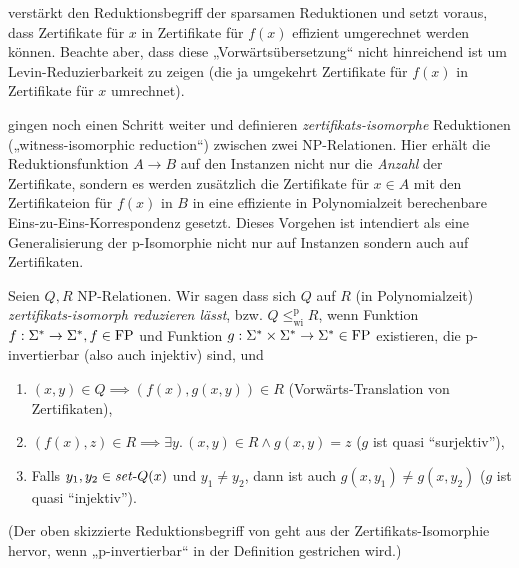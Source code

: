 \textcite{lynch_structure_1978} verstärkt den Reduktionsbegriff der sparsamen Reduktionen und setzt voraus, dass Zertifikate für $x$ in Zertifikate für $f(x)$ effizient umgerechnet werden können. Beachte aber, dass diese „Vorwärtsübersetzung“ nicht hinreichend ist um Levin-Reduzierbarkeit zu zeigen (die ja umgekehrt Zertifikate für $f(x)$ in Zertifikate für $x$ umrechnet).

\cite{wiedermann_witness-isomorphic_1995} gingen noch einen Schritt weiter und definieren \emph{zertifikats-isomorphe} Reduktionen („witness-isomorphic reduction“) zwischen zwei NP-Relationen. Hier erhält die Reduktionsfunktion $A\to B$ auf den Instanzen nicht nur die \emph{Anzahl} der Zertifikate, sondern es werden zusätzlich die Zertifikate für $x\in A$ mit den Zertifikateion für $f(x)$ in $B$ in eine effiziente in Polynomialzeit berechenbare Eins-zu-Eins-Korrespondenz gesetzt. Dieses Vorgehen ist intendiert als eine Generalisierung der p-Isomorphie \parencite{hartmanis_isomorphisms_1976} nicht nur auf Instanzen sondern auch auf Zertifikaten.

\begin{definition}\label{def:wi-reduction}
    Seien $Q, R$ NP-Relationen. Wir sagen dass sich $Q$ auf $R$ (in Polynomialzeit) \emph{zertifikats-isomorph reduzieren lässt}, bzw. $Q\leq_\mathrm{wi}^\mathrm p R$, wenn Funktion $f:\Sigma^*\to\Sigma^*, f\in \mathrm{FP}$ und Funktion $g:\Sigma^*\times\Sigma^*\to\Sigma^*\in\mathrm{FP}$ existieren, die p-invertierbar (also auch injektiv) sind, und 
    \begin{enumerate}
        \item $(x,y)\in Q \implies (f(x), g(x,y))\in R$ (Vorwärts-Translation von Zertifikaten),
        \item $(f(x),z)\in R \implies \exists y.\, (x,y)\in R\land g(x,y)=z$ ($g$ ist quasi “surjektiv”),
        \item Falls $y_1,y_2\in \mathit{set}\text{-}{}Q(x)$ und $y_1\neq y_2$, dann ist auch $g(x,y_1)\neq g(x,y_2)$ ($g$ ist quasi “injektiv”). \qedhere
    \end{enumerate}
\end{definition}
(Der oben skizzierte Reduktionsbegriff von \textcite{lynch_structure_1978} geht aus der Zertifikats-Isomorphie hervor, wenn „p-invertierbar“ in der Definition gestrichen wird.)

